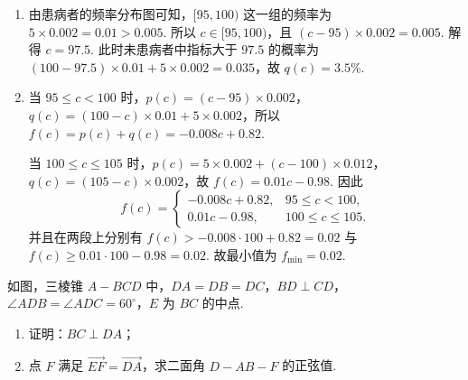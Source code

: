 \begin{solution}
\begin{enumerate}
\item 由患病者的频率分布图可知，\([95,100)\) 这一组的频率为 \(5\times 0.002=0.01>0.005\). 所以 \(c\in[95,100)\)，且 \((c-95)\times 0.002=0.005\).
解得 \(c=97.5\).
此时未患病者中指标大于 \(97.5\) 的概率为 \((100-97.5)\times 0.01+5\times 0.002=0.035\)，故 \(q(c)=3.5\%\).

\item 当 \(95\le c<100\) 时，\(p(c)=(c-95)\times 0.002\)，\(q(c)=(100-c)\times 0.01+5\times 0.002\)，所以 \(f(c)=p(c)+q(c)=-0.008c+0.82\).

	当 \(100\le c\le 105\) 时，\(p(c)=5\times 0.002+(c-100)\times 0.012\)，\(q(c)=(105-c)\times 0.002\)，故 \(f(c)=0.01c-0.98\).
因此
\[
f(c)=
\begin{cases}
-0.008c+0.82,&95\le c<100,\\
0.01c-0.98,&100\le c\le 105.
\end{cases}
\]
并且在两段上分别有 \(f(c)>-0.008\cdot 100+0.82=0.02\) 与
\(f(c)\ge 0.01\cdot 100-0.98=0.02\). 故最小值为 \(f_{\min}=0.02\).
\end{enumerate}
\end{solution}

\begin{problem}
如图，三棱锥 \(A-BCD\) 中，\(DA=DB=DC\)，\(BD\perp CD\)，\(\angle ADB=\angle ADC=60^\circ\)，\(E\) 为 \(BC\) 的中点.

\begin{enumerate}
\item 证明：\(BC\perp DA\)；
\item 点 \(F\) 满足 \(\overrightarrow{EF}=\overrightarrow{DA}\)，求二面角 \(D-AB-F\) 的正弦值.
\end{enumerate}

\end{problem}

